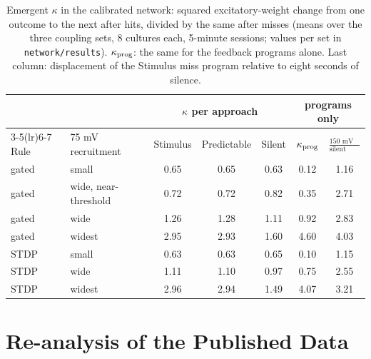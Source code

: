 \documentclass[12pt]{article}
\numberwithin{equation}{section}
\begin{document}
\begin{table}[t]
\centering\small
\begin{tabular}{llccccc}
\toprule
& & \multicolumn{3}{c}{$\kappa$ per approach} & \multicolumn{2}{c}{programs only} \\
\cmidrule(lr){3-5}\cmidrule(lr){6-7}
Rule & 75 mV recruitment & Stimulus & Predictable & Silent & $\kappa_{\rm prog}$ & $\frac{\text{150 mV miss}}{\text{silent miss}}$ \\
\midrule
gated & small & 0.65 & 0.65 & 0.63 & 0.12 & 1.16 \\
gated & wide, near-threshold & 0.72 & 0.72 & 0.82 & 0.35 & 2.71 \\
gated & wide & 1.26 & 1.28 & 1.11 & 0.92 & 2.83 \\
gated & widest & 2.95 & 2.93 & 1.60 & 4.60 & 4.03 \\
STDP & small & 0.63 & 0.63 & 0.65 & 0.10 & 1.15 \\
STDP & wide & 1.11 & 1.10 & 0.97 & 0.75 & 2.55 \\
STDP & widest & 2.96 & 2.94 & 1.49 & 4.07 & 3.21 \\
\bottomrule
\end{tabular}
\caption{Emergent $\kappa$ in the calibrated network: squared excitatory-weight change from one outcome to the next after hits, divided by the same after misses (means over the three coupling sets, 8 cultures each, 5-minute sessions; values per set in \texttt{network/results}). $\kappa_{\rm prog}$: the same for the feedback programs alone. Last column: displacement of the Stimulus miss program relative to eight seconds of silence.}
\label{tab:kappa}
\end{table}

\section{Re-analysis of the Published Data}\label{sec:reanalysis}
\end{document}
